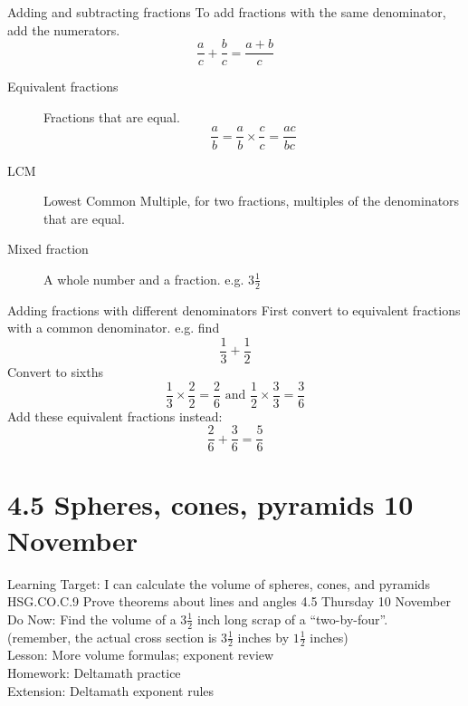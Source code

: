 \begin{frame}{Adding and subtracting fractions}
  To add fractions with the same denominator, add the numerators.
  $$\frac{a}{c} + \frac{b}{c} =\frac{a + b}{c}$$
  \begin{description}
    \item[Equivalent fractions] Fractions that are equal. 
    $$\frac{a}{b} = \frac{a}{b} \times \frac{c}{c} = \frac{ac}{bc}$$
    \item[LCM] Lowest Common Multiple, for two fractions, multiples of the denominators that are equal.
    \item[Mixed fraction] A whole number and a fraction. e.g. $3 \frac{1}{2}$
  \end{description}
  \end{frame}

\begin{frame}{Adding fractions with different denominators}
  First convert to equivalent fractions with a common denominator. e.g. find
  $$\frac{1}{3} + \frac{1}{2}$$
  Convert to sixths
  $$\frac{1}{3} \times \frac{2}{2} = \frac{2}{6} \text{ and } \frac{1}{2} \times \frac{3}{3} = \frac{3}{6}$$
  Add these equivalent fractions instead:
  $$\frac{2}{6} + \frac{3}{6} = \frac{5}{6} $$
  \end{frame}

\section{4.5 Spheres, cones, pyramids \hfill 10 November \,}
\begin{frame}{Learning Target: I can calculate the volume of spheres, cones, and pyramids}
  {HSG.CO.C.9 Prove theorems about lines and angles  \hfill \alert{4.5 Thursday 10 November}}
  Do Now: Find the volume of a $3 \frac{1}{2}$ inch long scrap of a ``two-by-four''. \\
    (remember, the actual cross section is $3 \frac{1}{2}$ inches by $1 \frac{1}{2}$ inches) \\[0.5cm]
    Lesson: More volume formulas; exponent review \\
    Homework: Deltamath practice \\
    Extension: Deltamath exponent rules
\end{frame}


